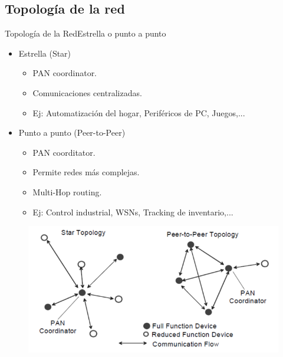 \documentclass[aspectratio=169, handout]{beamer}
\begin{document}
\subsection[Topología]{Topología de la red}

\begin{frame}{Topología de la Red}{Estrella o punto a punto}

\begin{minipage}[c]{1.0\linewidth}
	\begin{minipage}[c]{0.45\linewidth}
		\begin{itemize}
			\item Estrella (Star)
			\begin{itemize}
				\item PAN coordinator.
				\item Comunicaciones centralizadas.
				\item Ej: Automatización del hogar, Periféricos de PC, Juegos,...
					\end{itemize}
			\vspace{10px}
			\item Punto a punto (Peer-to-Peer)
			\begin{itemize}
				\item PAN coorditator.
				\item Permite redes más complejas.
				\item Multi-Hop routing.
				\item Ej: Control industrial,  WSNs, Tracking de inventario,...
			\end{itemize}
	  	\end{itemize}	
	\end{minipage}
	\hspace{-20px}
	\begin{minipage}[c]{0.7\linewidth}
		\begin{figure}[H]
			{\includegraphics[width=.7\textwidth]{./imagenes/Topology}}
		\end{figure}	  	  	
	\end{minipage}
\end{minipage}
\end{frame}
\end{document}
